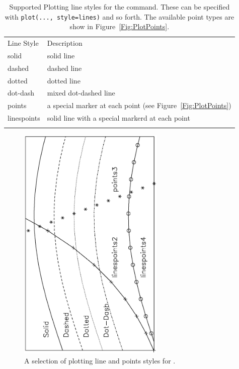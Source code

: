 {}
\begin{table}[t]
  \begin{center}
  \caption[a]{Supported Plotting line styles for the  {} command.
    These can be specified with {\tt{plot(..., style=lines)}} and so
    forth. The available point types are show in
    Figure~\ref{Fig:PlotPoints}.  }
  {\label{Table:plot_style}}
    \begin{tabular}{ll}
      \noalign{\smallskip}
      Line Style & Description   \\
      \noalign{\smallskip}    \hline    \noalign{\smallskip}
       solid       & solid line \\
       dashed      & dashed line\\
       dotted      & dotted line\\
       dot-dash    & mixed dot-dashed line\\
       points      & a special marker at each point
                       (see Figure~\ref{Fig:PlotPoints}) \\
       linespoints & solid line with a special markerd at each point\\
      \noalign{\smallskip}    \hline
    \end{tabular}
  \end{center}
\end{table}



\begin{figure}[tb] \begin{center}
  \includegraphics[width=2.75in,angle=-90]{figs/plot_styles.ps}
  \caption{ A selection of plotting line and points styles
 for {\ifeffit}.}\label{Fig:PlotStyles}
\end{center} \end{figure}



